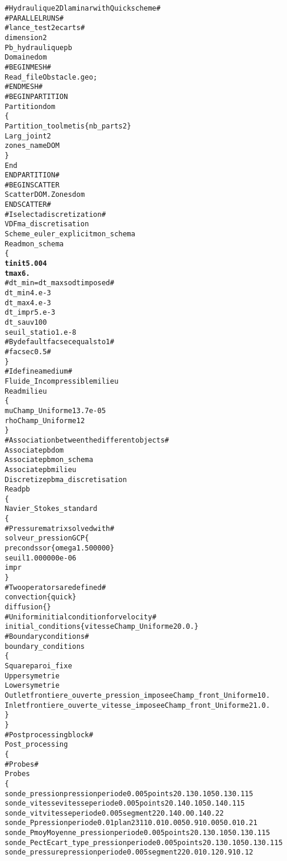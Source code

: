 \begin{alltt}
# Hydraulique 2D laminar with Quick scheme #
# PARALLEL RUNS # 
# lance_test 2 ecarts # 
dimension 2 
Pb_hydraulique pb 
Domaine dom 
# BEGIN MESH # 
Read_file Obstacle.geo ; 
# END MESH # 
# BEGIN PARTITION 
Partition dom 
\{ 
    Partition_tool metis \{ nb_parts 2 \} 
    Larg_joint 2 
    zones_name DOM 
\} 
End 
END PARTITION # 
# BEGIN SCATTER 
Scatter DOM.Zones dom 
END SCATTER # 
# I select a discretization # 
VDF ma_discretisation 
Scheme_euler_explicit mon_schema 
Read mon_schema 
\{ 
    {\bf{tinit 5.004}}
    {\bf{tmax  6.}}
    # dt_min=dt_max so dt imposed # 
    dt_min 4.e-3
    dt_max 4.e-3
    dt_impr 5.e-3
    dt_sauv 100 
    seuil_statio 1.e-8 
    # By default facsec equals to 1 # 
    # facsec 0.5 # 
\} 
# I define a medium # 
Fluide_Incompressible milieu 
Read milieu 
\{ 
    mu Champ_Uniforme 1 3.7e-05 
    rho Champ_Uniforme 1 2 
\} 
# Association between the different objects # 
Associate pb dom 
Associate pb mon_schema 
Associate pb milieu 
Discretize pb ma_discretisation 
Read pb 
\{ 
    Navier_Stokes_standard 
    \{ 
        # Pressure matrix solved with # 
            solveur_pression GCP \{  
            precond ssor \{ omega 1.500000 \}  
            seuil 1.000000e-06  
            impr  
        \} 
        # Two operators are defined # 
        convection \{ quick \} 
        diffusion \{ \} 
        # Uniform initial condition for velocity # 
        initial_conditions \{ vitesse Champ_Uniforme 2 0. 0. \}
        # Boundary conditions # 
        boundary_conditions 
        \{ 
            Square      paroi_fixe 
            Upper       symetrie 
            Lower       symetrie 
            Outlet      frontiere_ouverte_pression_imposee Champ_front_Uniforme 1 0. 
            Inlet       frontiere_ouverte_vitesse_imposee Champ_front_Uniforme 2 1. 0. 
        \} 
    \} 
    # Post processing block # 
    Post_processing
    \{ 
        # Probes # 
        Probes 
        \{ 
            sonde_pression  pression     periode 0.005   points 2 0.13 0.105 0.13 0.115 
            sonde_vitesse   vitesse      periode 0.005   points 2 0.14 0.105    0.14 0.115 
            sonde_vit       vitesse      periode 0.005   segment 22 0.14 0.0 0.14 0.22 
            sonde_P         pression     periode 0.01    plan 23 11 0.01 0.005 0.91 0.005 0.01 0.21 
            sonde_Pmoy      Moyenne_pression    periode 0.005   points 2 0.13 0.105 0.13 0.115 
            sonde_Pect      Ecart_type_pression periode 0.005   points 2 0.13 0.105 0.13 0.115 
            sonde_pressure   pression     periode 0.005   segment 22 0.01 0.12 0.91 0.12

\end{alltt}

